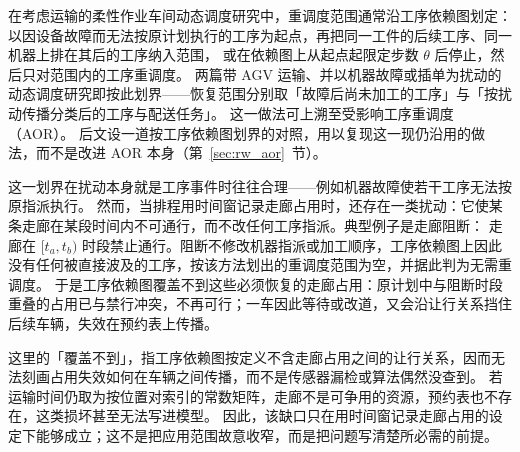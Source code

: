 \documentclass[manuscript,screen,review]{acmart}
\begin{document}
在考虑运输的柔性作业车间动态调度研究中，重调度范围通常沿工序依赖图划定：以因设备故障而无法按原计划执行的工序为起点，再把同一工件的后续工序、同一机器上排在其后的工序纳入范围，
或在依赖图上从起点起限定步数 \(\theta\) 后停止，然后只对范围内的工序重调度。
两篇带 AGV 运输、并以机器故障或插单为扰动的动态调度研究即按此划界——恢复范围分别取「故障后尚未加工的工序」与「按扰动传播分类后的工序与配送任务」。
这一做法可上溯至受影响工序重调度（AOR）\cite{zhang2023energy,tang2026dynamic}。
后文设一道按工序依赖图划界的对照，用以复现这一现仍沿用的做法，而不是改进 AOR 本身（第~\ref{sec:rw_aor}~节）。

这一划界在扰动本身就是工序事件时往往合理——例如机器故障使若干工序无法按原指派执行。
然而，当排程用时间窗记录走廊占用时，还存在一类扰动：它使某条走廊在某段时间内不可通行，而不改任何工序指派。典型例子是走廊阻断：
走廊在 \([t_a,t_b)\) 时段禁止通行。阻断不修改机器指派或加工顺序，工序依赖图上因此没有任何被直接波及的工序，按该方法划出的重调度范围为空，并据此判为无需重调度。
于是工序依赖图覆盖不到这些必须恢复的走廊占用：原计划中与阻断时段重叠的占用已与禁行冲突，不再可行；一车因此等待或改道，又会沿让行关系挡住后续车辆，失效在预约表上传播。

这里的「覆盖不到」，指工序依赖图按定义不含走廊占用之间的让行关系，因而无法刻画占用失效如何在车辆之间传播，而不是传感器漏检或算法偶然没查到。
若运输时间仍取为按位置对索引的常数矩阵，走廊不是可争用的资源，预约表也不存在，这类损坏甚至无法写进模型。
因此，该缺口只在用时间窗记录走廊占用的设定下能够成立；这不是把应用范围故意收窄，而是把问题写清楚所必需的前提。
\end{document}
